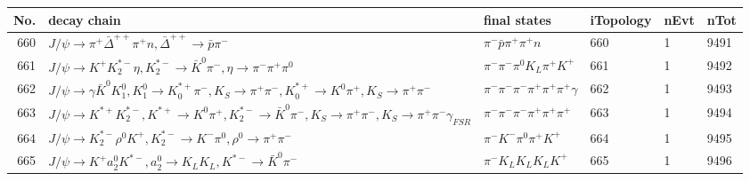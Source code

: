 \begin{table}[htbp] 
\begin{center}
\begin{small}
\begin{tabular}{rlllll}\hline\hline
 No. & decay chain & final states &  iTopology & nEvt & nTot \\\hline
660&$J/\psi       \rightarrow \pi^{+}        \bar{\Delta}^{++}\pi^{+}        n                 , \bar{\Delta}^{++} \rightarrow \bar{p}          \pi^{-}        $&$\pi^{-}        \bar{p}          \pi^{+}        \pi^{+}        n                 $&  660&    1& 9491\\
661&$J/\psi       \rightarrow K^{+}          K_2^{*-}       \eta          , K_2^{*-}        \rightarrow \bar{K}^{0}   \pi^{-}        , \eta           \rightarrow \pi^{-}        \pi^{+}        \pi^{0}        $&$\pi^{-}        \pi^{-}        \pi^{0}        K_{L}          \pi^{+}        K^{+}          $&  661&    1& 9492\\
662&$J/\psi       \rightarrow \gamma       \bar{K}^{0}   K_1^{0}        , K_1^{0}         \rightarrow K_{0}^{*+}     \pi^{-}        , K_{S}           \rightarrow \pi^{+}        \pi^{-}        , K_{0}^{*+}      \rightarrow K^{0}          \pi^{+}        , K_{S}           \rightarrow \pi^{+}        \pi^{-}        $&$\pi^{-}        \pi^{-}        \pi^{-}        \pi^{+}        \pi^{+}        \pi^{+}        \gamma       $&  662&    1& 9493\\
663&$J/\psi       \rightarrow K^{*+}         K_2^{*-}       , K^{*+}          \rightarrow K^{0}          \pi^{+}        , K_2^{*-}        \rightarrow \bar{K}^{0}   \pi^{-}        , K_{S}           \rightarrow \pi^{+}        \pi^{-}        , K_{S}           \rightarrow \pi^{+}        \pi^{-}        \gamma_{FSR} $&$\pi^{-}        \pi^{-}        \pi^{-}        \pi^{+}        \pi^{+}        \pi^{+}        $&  663&    1& 9494\\
664&$J/\psi       \rightarrow K_2^{*-}       \rho^{0}      K^{+}          , K_2^{*-}        \rightarrow K^{-}          \pi^{0}        , \rho^{0}       \rightarrow \pi^{+}        \pi^{-}        $&$\pi^{-}        K^{-}          \pi^{0}        \pi^{+}        K^{+}          $&  664&    1& 9495\\
665&$J/\psi       \rightarrow K^{+}          a_{2}^{0}      K^{*-}         , a_{2}^{0}       \rightarrow K_{L}          K_{L}          , K^{*-}          \rightarrow \bar{K}^{0}   \pi^{-}        $&$\pi^{-}        K_{L}          K_{L}          K_{L}          K^{+}          $&  665&    1& 9496\\

\end{tabular}
\end{small}
\end{center}
\end{table}
